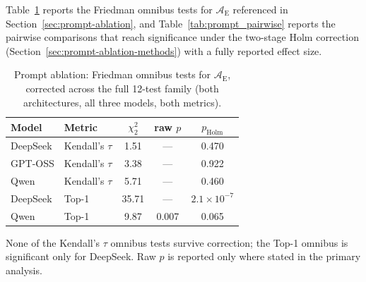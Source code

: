 \documentclass[final,3p,times]{elsarticle}
\begin{document}
Table~\ref{tab:prompt_friedman} reports the Friedman omnibus tests for $\mathcal{A}_{\text{E}}$ referenced in Section~\ref{sec:prompt-ablation}, and Table~\ref{tab:prompt_pairwise} reports the pairwise comparisons that reach significance under the two-stage Holm correction (Section~\ref{sec:prompt-ablation-methods}) with a fully reported effect size.

\begin{table}[t]
\begin{threeparttable}
\small
\centering
\renewcommand{\arraystretch}{1.10}
\caption{Prompt ablation: Friedman omnibus tests for $\mathcal{A}_{\text{E}}$, corrected across the full 12-test family (both architectures, all three models, both metrics).}
\label{tab:prompt_friedman}
\begin{tabular}{@{}ll ccc@{}}
\toprule
Model & Metric & $\chi^2_2$ & raw $p$ & $p_{\text{Holm}}$ \\
\midrule
DeepSeek & Kendall's $\tau$ & 1.51 & --- & 0.470 \\
GPT-OSS & Kendall's $\tau$ & 3.38 & --- & 0.922 \\
Qwen & Kendall's $\tau$ & 5.71 & --- & 0.460 \\
DeepSeek & Top-1 & 35.71 & --- & $2.1\times10^{-7}$ \\
Qwen & Top-1 & 9.87 & 0.007 & 0.065 \\
\bottomrule
\end{tabular}
\renewcommand{\arraystretch}{1.0}
\begin{tablenotes}
\item None of the Kendall's $\tau$ omnibus tests survive correction; the Top-1 omnibus is significant only for DeepSeek. Raw $p$ is reported only where stated in the primary analysis.
\end{tablenotes}
\end{threeparttable}
\end{table}
\end{document}
